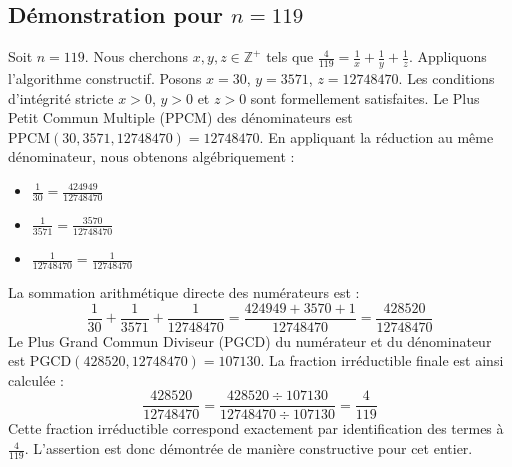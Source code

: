 \documentclass[11pt,a4paper]{article}
\begin{document}
\subsection{Démonstration pour $n = 119$}
Soit $n = 119$. Nous cherchons $x, y, z \in \mathbb{Z}^{+}$ tels que $\frac{4}{119} = \frac{1}{x} + \frac{1}{y} + \frac{1}{z}$.
Appliquons l'algorithme constructif. Posons $x = 30$, $y = 3571$, $z = 12748470$.
Les conditions d'intégrité stricte $x > 0$, $y > 0$ et $z > 0$ sont formellement satisfaites.
Le Plus Petit Commun Multiple (PPCM) des dénominateurs est $\text{PPCM}(30, 3571, 12748470) = 12748470$.
En appliquant la réduction au même dénominateur, nous obtenons algébriquement :
\begin{itemize}
    \item $\frac{1}{30} = \frac{424949}{12748470}$
    \item $\frac{1}{3571} = \frac{3570}{12748470}$
    \item $\frac{1}{12748470} = \frac{1}{12748470}$
\end{itemize}
La sommation arithmétique directe des numérateurs est :
$$ \frac{1}{30} + \frac{1}{3571} + \frac{1}{12748470} = \frac{424949 + 3570 + 1}{12748470} = \frac{428520}{12748470} $$
Le Plus Grand Commun Diviseur (PGCD) du numérateur et du dénominateur est $\text{PGCD}(428520, 12748470) = 107130$.
La fraction irréductible finale est ainsi calculée :
$$ \frac{428520}{12748470} = \frac{428520 \div 107130}{12748470 \div 107130} = \frac{4}{119} $$
Cette fraction irréductible correspond exactement par identification des termes à $\frac{4}{119}$. L'assertion est donc démontrée de manière constructive pour cet entier.
\end{document}
